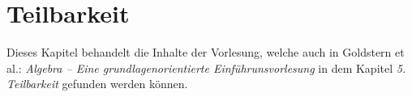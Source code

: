 \chapter{Teilbarkeit}

Dieses Kapitel behandelt die Inhalte der Vorlesung, welche auch in Goldstern et al.: \textit{Algebra -- Eine grundlagenorientierte Einführunsvorlesung} in dem Kapitel \textit{5. Teilbarkeit} gefunden werden können.




